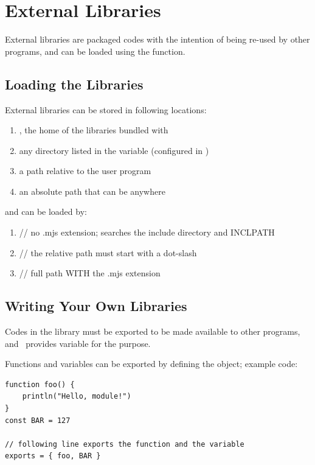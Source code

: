 \chapter{External Libraries}


External libraries are packaged codes with the intention of being re-used by other programs, and can be loaded using the  function.

\section{Loading the Libraries}

External libraries can be stored in following locations:

\begin{enumerate}
 \item {}, the home of the libraries bundled with \thedos
 \item any directory listed in the  variable (configured in )
 \item a path relative to the user program
 \item an absolute path that can be anywhere
\end{enumerate}

and can be loaded by:

\begin{enumerate}
 \item {} // no .mjs extension; searches the include directory and INCLPATH
 \item {} // the relative path must start with a dot-slash
 \item {} // full path WITH the .mjs extension
\end{enumerate}


\section{Writing Your Own Libraries}

Codes in the library must be exported to be made available to other programs, and \thedos\ provides  variable for the purpose.

Functions and variables can be exported by defining the  object; example code:

\begin{lstlisting}
function foo() {
    println("Hello, module!")
}
const BAR = 127

// following line exports the function and the variable
exports = { foo, BAR }
\end{lstlisting}



